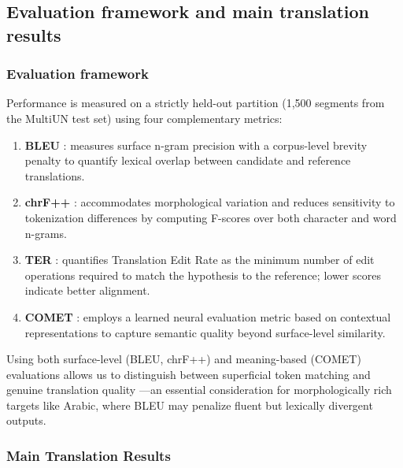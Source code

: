 \documentclass{article}
\begin{document}
	\subsection{Evaluation framework and main translation results}
	\label{sec:eval}
	\subsubsection{Evaluation framework}
	Performance is measured on a strictly held-out partition (1,500 segments from the MultiUN test
	set) using four complementary metrics:
	\begin{enumerate}
		\item \textbf{BLEU} \citep{papineni2002bleu}: measures surface n-gram precision with a
		corpus-level brevity penalty to quantify lexical overlap between candidate and reference
		translations.
		\item \textbf{chrF++} \citep{popovic2015chrf}: accommodates morphological variation and
		reduces sensitivity to tokenization differences by computing F-scores over both character
		and word n-grams.
		\item \textbf{TER} \citep{snover2006ter}: quantifies Translation Edit Rate as the minimum
		number of edit operations required to match the hypothesis to the reference; lower scores
		indicate better alignment.
		\item \textbf{COMET} \citep{rei2020comet}: employs a learned neural evaluation metric based
		on contextual representations to capture semantic quality beyond surface-level similarity.
	\end{enumerate}
	Using both surface-level (BLEU, chrF++) and meaning-based (COMET) evaluations allows
	us to distinguish between superficial token matching and genuine translation quality ---an
	essential consideration for morphologically rich targets like Arabic, where BLEU may
	penalize fluent but lexically divergent outputs.
	
	\subsubsection{Main Translation Results}
	\label{sec:main-results}
	
\end{document}
